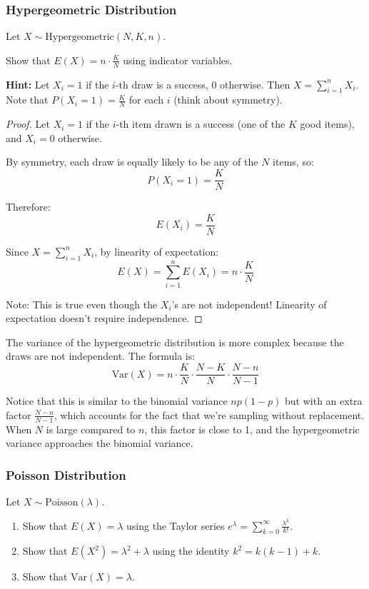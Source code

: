 \subsubsection{Hypergeometric Distribution}

\begin{exercise}
Let \(X \sim \text{Hypergeometric}(N, K, n)\).

Show that \(E(X) = n \cdot \frac{K}{N}\) using indicator variables.

\textbf{Hint:} Let \(X_i = 1\) if the \(i\)-th draw is a success, \(0\) otherwise. Then \(X = \sum_{i=1}^{n} X_i\). Note that \(P(X_i = 1) = \frac{K}{N}\) for each \(i\) (think about symmetry).
\end{exercise}

\begin{proof}
Let \(X_i = 1\) if the \(i\)-th item drawn is a success (one of the \(K\) good items), and \(X_i = 0\) otherwise.

By symmetry, each draw is equally likely to be any of the \(N\) items, so:
\[
P(X_i = 1) = \frac{K}{N}
\]

Therefore:
\[
E(X_i) = \frac{K}{N}
\]

Since \(X = \sum_{i=1}^{n} X_i\), by linearity of expectation:
\[
E(X) = \sum_{i=1}^{n} E(X_i) = n \cdot \frac{K}{N}
\]

Note: This is true even though the \(X_i\)'s are not independent! Linearity of expectation doesn't require independence.
\end{proof}

\begin{remark}
The variance of the hypergeometric distribution is more complex because the draws are not independent. The formula is:
\[
\text{Var}(X) = n \cdot \frac{K}{N} \cdot \frac{N-K}{N} \cdot \frac{N-n}{N-1}
\]

Notice that this is similar to the binomial variance \(np(1-p)\) but with an extra factor \(\frac{N-n}{N-1}\), which accounts for the fact that we're sampling without replacement. When \(N\) is large compared to \(n\), this factor is close to 1, and the hypergeometric variance approaches the binomial variance.
\end{remark}

\subsubsection{Poisson Distribution}

\begin{exercise}
Let \(X \sim \text{Poisson}(\lambda)\).

\begin{enumerate}[label=(\alph*)]
    \item Show that \(E(X) = \lambda\) using the Taylor series \(e^{\lambda} = \sum_{k=0}^{\infty} \frac{\lambda^k}{k!}\).
    \item Show that \(E(X^2) = \lambda^2 + \lambda\) using the identity \(k^2 = k(k-1) + k\).
    \item Show that \(\text{Var}(X) = \lambda\).
\end{enumerate}
\end{exercise}

